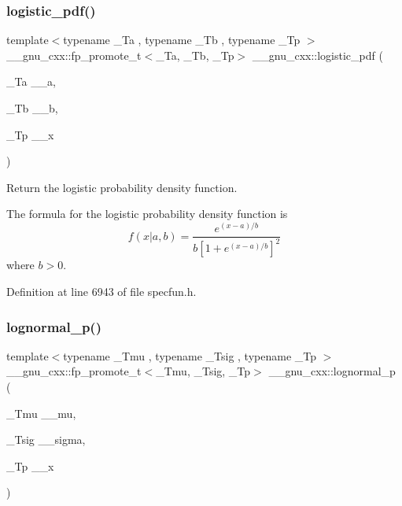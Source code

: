 \subsubsection{\texorpdfstring{logistic\+\_\+pdf()}{logistic\_pdf()}}
{\footnotesize\ttfamily template$<$typename \+\_\+\+Ta , typename \+\_\+\+Tb , typename \+\_\+\+Tp $>$ \\
\+\_\+\+\_\+gnu\+\_\+cxx\+::fp\+\_\+promote\+\_\+t$<$\+\_\+\+Ta, \+\_\+\+Tb, \+\_\+\+Tp$>$ \+\_\+\+\_\+gnu\+\_\+cxx\+::logistic\+\_\+pdf (\begin{DoxyParamCaption}\item[{\+\_\+\+Ta}]{\+\_\+\+\_\+a,  }\item[{\+\_\+\+Tb}]{\+\_\+\+\_\+b,  }\item[{\+\_\+\+Tp}]{\+\_\+\+\_\+x }\end{DoxyParamCaption})\hspace{0.3cm}{\ttfamily [inline]}}



Return the logistic probability density function. 

The formula for the logistic probability density function is \[ f(x| a, b) = \frac{e^{(x - a)/b}}{b[1 + e^{(x - a)/b}]^2} \] where $b > 0$. 

Definition at line 6943 of file specfun.\+h.

\mbox{\label{group__mathsf__gnu_ga3bbd4feb10f2d745bf8aca8748099c53}} 
\subsubsection{\texorpdfstring{lognormal\+\_\+p()}{lognormal\_p()}}
{\footnotesize\ttfamily template$<$typename \+\_\+\+Tmu , typename \+\_\+\+Tsig , typename \+\_\+\+Tp $>$ \\
\+\_\+\+\_\+gnu\+\_\+cxx\+::fp\+\_\+promote\+\_\+t$<$\+\_\+\+Tmu, \+\_\+\+Tsig, \+\_\+\+Tp$>$ \+\_\+\+\_\+gnu\+\_\+cxx\+::lognormal\+\_\+p (\begin{DoxyParamCaption}\item[{\+\_\+\+Tmu}]{\+\_\+\+\_\+mu,  }\item[{\+\_\+\+Tsig}]{\+\_\+\+\_\+sigma,  }\item[{\+\_\+\+Tp}]{\+\_\+\+\_\+x }\end{DoxyParamCaption})\hspace{0.3cm}{\ttfamily [inline]}}



